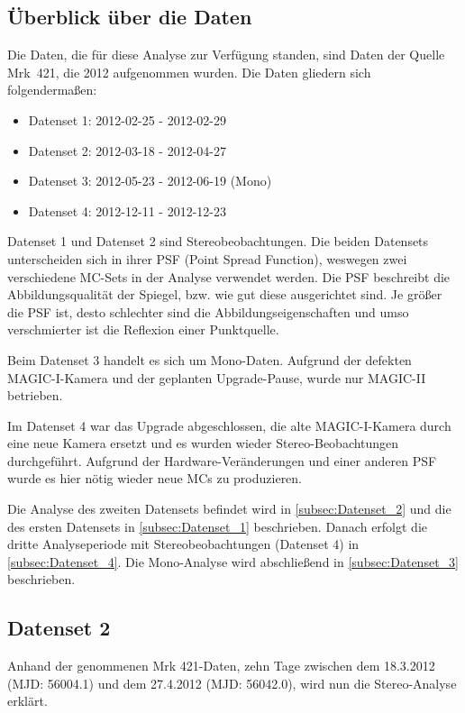 \subsection{Überblick über die Daten}
Die Daten, die für diese Analyse zur Verfügung standen, sind Daten der Quelle Mrk~421, die 2012 aufgenommen wurden.
Die Daten gliedern sich folgendermaßen:

\begin{itemize}
 \item Datenset 1: 2012-02-25 - 2012-02-29
 \item Datenset 2: 2012-03-18 - 2012-04-27
 \item Datenset 3: 2012-05-23 - 2012-06-19 (Mono)
 \item Datenset 4: 2012-12-11 - 2012-12-23
\end{itemize}

Datenset 1 und Datenset 2 sind Stereobeobachtungen.
Die beiden Datensets unterscheiden sich in ihrer PSF (Point Spread Function), weswegen zwei verschiedene MC-Sets in der Analyse verwendet werden.
Die PSF beschreibt die Abbildungsqualität der Spiegel, bzw. wie gut diese ausgerichtet sind.
Je größer die PSF ist, desto schlechter sind die Abbildungseigenschaften und umso verschmierter ist die Reflexion einer Punktquelle.

Beim Datenset 3 handelt es sich um Mono-Daten. 
Aufgrund der defekten MAGIC-I-Kamera und der geplanten Upgrade-Pause, wurde nur MAGIC-II betrieben.

Im Datenset 4 war das Upgrade abgeschlossen, die alte MAGIC-I-Kamera durch eine neue Kamera ersetzt und es wurden wieder Stereo-Beobachtungen durchgeführt.
Aufgrund der Hardware-Veränderungen und einer anderen PSF wurde es hier nötig wieder neue MCs zu produzieren.

Die Analyse des zweiten Datensets befindet wird in \autoref{subsec:Datenset_2} und die des ersten Datensets in \autoref{subsec:Datenset_1} beschrieben.
Danach erfolgt die dritte Analyseperiode mit Stereobeobachtungen (Datenset 4) in \autoref{subsec:Datenset_4}.
Die Mono-Analyse wird abschließend in \autoref{subsec:Datenset_3} beschrieben.


\subsection{Datenset 2}
\label{subsec:Datenset_2}
Anhand der genommenen Mrk 421-Daten, zehn Tage zwischen dem 18.3.2012 (MJD: 56004.1) und dem 27.4.2012 (MJD: 56042.0), wird nun die Stereo-Analyse erklärt.

